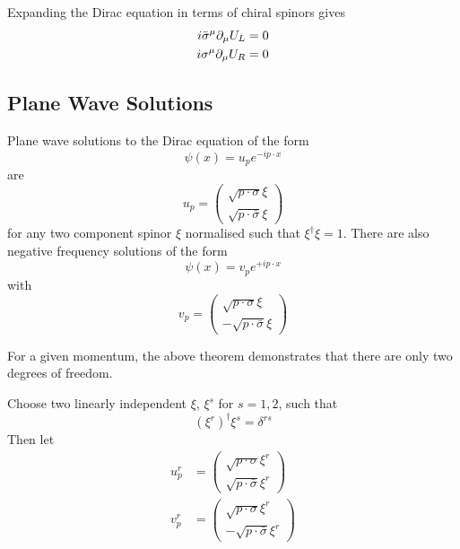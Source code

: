 \documentclass{article}
\begin{document}
\begin{definition}
Expanding the Dirac equation in terms of chiral spinors gives 
\begin{align*}
    i \bar{\sigma}^\mu \partial_\mu U_L &= 0 \\
    i \sigma^\mu \partial_\mu U_R &= 0
\end{align*}
\end{definition}

\subsection{Plane Wave Solutions}

\begin{theorem}
Plane wave solutions to the Dirac equation of the form 
\[
\psi(x) = u_p e^{-i p\cdot x }
\]
are
\[
u_p = \begin{pmatrix} \sqrt{p\cdot\sigma} \xi \\ \sqrt{p\cdot\bar{\sigma}} \xi \end{pmatrix}
\]
for any two component spinor $\xi$ normalised such that $\xi^\dagger \xi = 1$. There are also negative frequency solutions of the form 
\[
\psi(x) = v_p e^{+i p\cdot x }
\]
with 
\[
v_p = \begin{pmatrix} \sqrt{p\cdot\sigma} \xi \\ -\sqrt{p\cdot\bar{\sigma}} \xi \end{pmatrix}
\]
\end{theorem}

\begin{idea}
For a given momentum, the above theorem demonstrates that there are only two degrees of freedom. 
\end{idea}

\begin{definition}
Choose two linearly independent $\xi$, $\xi^s$ for $s=1,2$, such that 
\[
(\xi^r)^\dagger \xi^s = \delta^{rs}
\]
Then let 
\begin{align*}
    u_p^r &= \begin{pmatrix} \sqrt{p\cdot\sigma} \xi^r \\ \sqrt{p\cdot\bar{\sigma}} \xi^r \end{pmatrix} \\
    v_p^r &= \begin{pmatrix} \sqrt{p\cdot\sigma} \xi^r \\ -\sqrt{p\cdot\bar{\sigma}} \xi^r \end{pmatrix} \\
\end{align*}
\end{definition}
\end{document}
